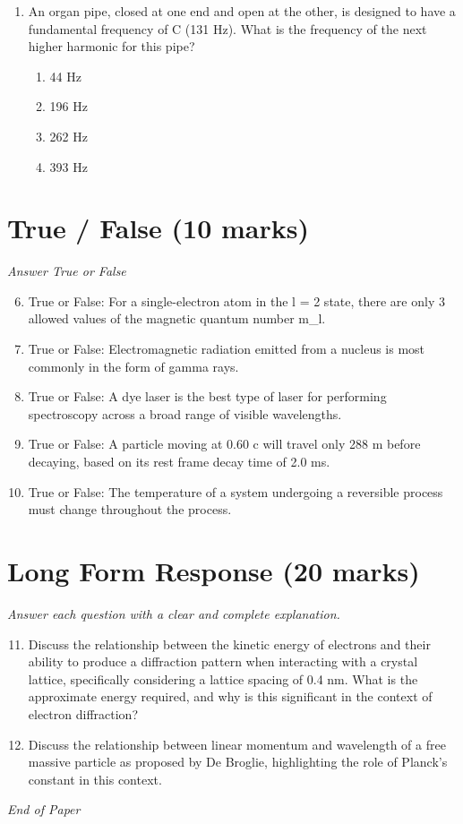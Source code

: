 \documentclass[12pt]{article}
\begin{document}
\begin{enumerate}[label=\arabic*.]
\begin{enumerate}[label=(\alph*)]
    \item Adiabatic
\end{enumerate}
\item An organ pipe, closed at one end and open at the other, is designed to have a fundamental frequency of C (131 Hz). What is the frequency of the next higher harmonic for this pipe?
\begin{enumerate}[label=(\alph*)]
    \item 44 Hz
    \item 196 Hz
    \item 262 Hz
    \item 393 Hz
\end{enumerate}
\end{enumerate}

\section*{True / False (10 marks)}
\textit{Answer True or False}
\begin{enumerate}[label=\arabic*.]
\setcounter{enumi}{5}
\item True or False: For a single-electron atom in the l = 2 state, there are only 3 allowed values of the magnetic quantum number m\_l.
\item True or False: Electromagnetic radiation emitted from a nucleus is most commonly in the form of gamma rays.
\item True or False: A dye laser is the best type of laser for performing spectroscopy across a broad range of visible wavelengths.
\item True or False: A particle moving at 0.60 c will travel only 288 m before decaying, based on its rest frame decay time of 2.0 ms.
\item True or False: The temperature of a system undergoing a reversible process must change throughout the process.
\end{enumerate}

\section*{Long Form Response (20 marks)}
\textit{Answer each question with a clear and complete explanation.}
\begin{enumerate}[label=\arabic*.]
\setcounter{enumi}{10}
\item Discuss the relationship between the kinetic energy of electrons and their ability to produce a diffraction pattern when interacting with a crystal lattice, specifically considering a lattice spacing of 0.4 nm. What is the approximate energy required, and why is this significant in the context of electron diffraction?
\item Discuss the relationship between linear momentum and wavelength of a free massive particle as proposed by De Broglie, highlighting the role of Planck's constant in this context.
\end{enumerate}

\vfill
\noindent\textit{End of Paper}
\end{document}
